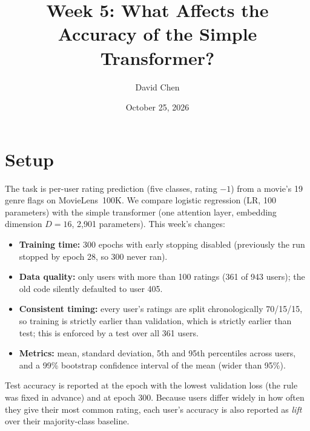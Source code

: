 \documentclass[11pt]{article}
\title{Week 5: What Affects the Accuracy of the Simple Transformer?}
\author{David Chen}
\date{October 25, 2026}
\begin{document}
\maketitle

\section{Setup}
The task is per-user rating prediction (five classes, rating $-1$) from a movie's 19 genre flags on MovieLens~100K.
We compare logistic regression (LR, 100 parameters) with the simple transformer (one attention layer, embedding
dimension $D=16$, 2{,}901 parameters). This week's changes:
\begin{itemize}
  \item \textbf{Training time:} 300 epochs with early stopping disabled (previously the run stopped by epoch 28, so 300 never ran).
  \item \textbf{Data quality:} only users with more than 100 ratings (361 of 943 users); the old code silently defaulted to user 405.
  \item \textbf{Consistent timing:} every user's ratings are split chronologically 70/15/15, so training is strictly earlier than validation, which is strictly earlier than test; this is enforced by a test over all 361 users.
  \item \textbf{Metrics:} mean, standard deviation, 5th and 95th percentiles across users, and a 99\% bootstrap confidence interval of the mean (wider than 95\%).
\end{itemize}
Test accuracy is reported at the epoch with the lowest validation loss (the rule was fixed in advance) and at epoch 300.
Because users differ widely in how often they give their most common rating, each user's accuracy is also reported as
\emph{lift} over their majority-class baseline.
\end{document}
